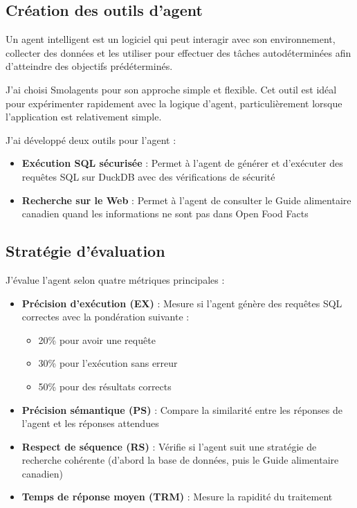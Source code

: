\documentclass[a4paper,11pt]{article}
\begin{document}
\subsection{Création des outils d'agent}

Un agent intelligent est un logiciel qui peut interagir avec son environnement, collecter des données et les utiliser pour effectuer des tâches autodéterminées afin d'atteindre des objectifs prédéterminés.

J'ai choisi Smolagents pour son approche simple et flexible. Cet outil est idéal pour expérimenter rapidement avec la logique d'agent, particulièrement lorsque l'application est relativement simple.

\newpage
J'ai développé deux outils pour l'agent :

\begin{itemize}
    \item \textbf{Exécution SQL sécurisée} : Permet à l'agent de générer et d'exécuter des requêtes SQL sur DuckDB avec des vérifications de sécurité
    \item \textbf{Recherche sur le Web} : Permet à l'agent de consulter le Guide alimentaire canadien quand les informations ne sont pas dans Open Food Facts
\end{itemize}


\subsection{Stratégie d'évaluation}

J'évalue l'agent selon quatre métriques principales :

\begin{itemize}
    \item \textbf{Précision d'exécution (EX)} : Mesure si l'agent génère des requêtes SQL correctes 
    avec la pondération suivante :
    \begin{itemize}
        \item 20\% pour avoir une requête
        \item 30\% pour l'exécution sans erreur
        \item 50\% pour des résultats corrects
    \end{itemize}
    
    \item \textbf{Précision sémantique (PS)} : Compare la similarité entre les réponses de l'agent et les réponses attendues
    
    \item \textbf{Respect de séquence (RS)} : Vérifie si l'agent suit une stratégie de recherche cohérente (d'abord la base de données, puis le Guide alimentaire canadien)
    
    \item \textbf{Temps de réponse moyen (TRM)} : Mesure la rapidité du traitement
\end{itemize}
\end{document}
